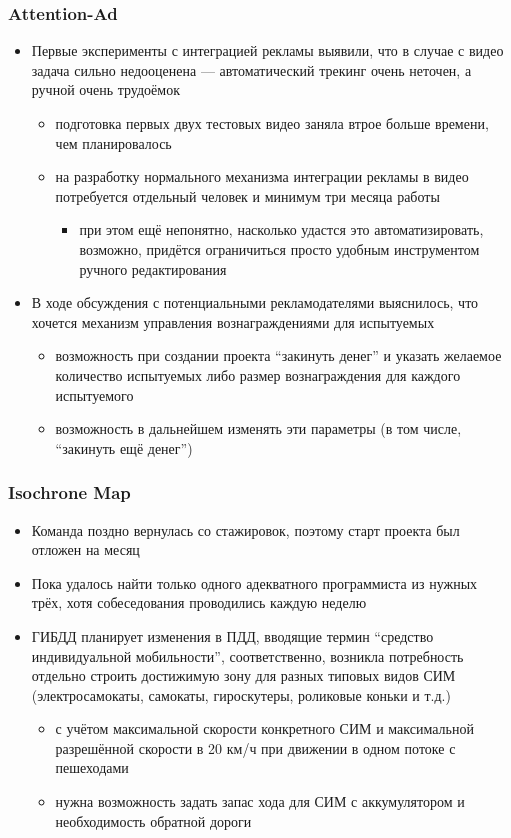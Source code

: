 \documentclass[xetex,mathserif,serif]{beamer}
\begin{document}
	\begin{frame}
		\frametitle{Attention-Ad}
		\begin{itemize}
			\item Первые эксперименты с интеграцией рекламы выявили, что в случае с видео задача сильно недооценена --- автоматический трекинг очень неточен, а ручной очень трудоёмок
			\begin{itemize}
				\item подготовка первых двух тестовых видео заняла втрое больше времени, чем планировалось
				\item на разработку нормального механизма интеграции рекламы в видео потребуется отдельный человек и минимум три месяца работы
				\begin{itemize}
					\item при этом ещё непонятно, насколько удастся это автоматизировать, возможно, придётся ограничиться просто удобным инструментом ручного редактирования
				\end{itemize}
			\end{itemize}
			\item В ходе обсуждения с потенциальными рекламодателями выяснилось, что хочется механизм управления вознаграждениями для испытуемых
			\begin{itemize}
				\item возможность при создании проекта ``закинуть денег'' и указать желаемое количество испытуемых либо размер вознаграждения для каждого испытуемого
				\item возможность в дальнейшем изменять эти параметры (в том числе, ``закинуть ещё денег'')
			\end{itemize}
		\end{itemize}
	\end{frame}

	\begin{frame}
		\frametitle{Isochrone Map}
		\begin{itemize}
			\item Команда поздно вернулась со стажировок, поэтому старт проекта был отложен на месяц
			\item Пока удалось найти только одного адекватного программиста из нужных трёх, хотя собеседования проводились каждую неделю
			\item ГИБДД планирует изменения в ПДД, вводящие термин ``средство индивидуальной мобильности'', соответственно, возникла потребность отдельно строить достижимую зону для разных типовых видов СИМ (электросамокаты, самокаты, гироскутеры, роликовые коньки и т.д.)
			\begin{itemize}
				\item с учётом максимальной скорости конкретного СИМ и максимальной разрешённой скорости в 20 км/ч при движении в одном потоке с пешеходами
				\item нужна возможность задать запас хода для СИМ с аккумулятором и необходимость обратной дороги
			\end{itemize}
		\end{itemize}
	\end{frame}
\end{document}
